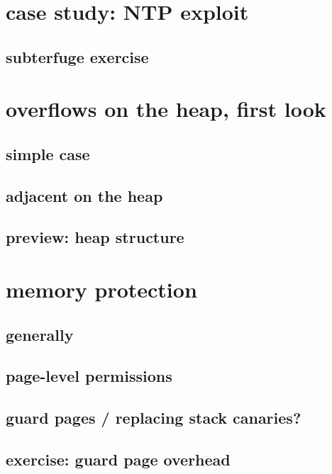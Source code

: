 

\section{case study: NTP exploit}


\subsection{subterfuge exercise}


\section{overflows on the heap, first look}
\subsection{simple case}


\subsection{adjacent on the heap}


\subsection{preview: heap structure}


\section{memory protection}
\subsection{generally}


\subsection{page-level permissions}


\subsection{guard pages / replacing stack canaries?}


\subsection{exercise: guard page overhead}


